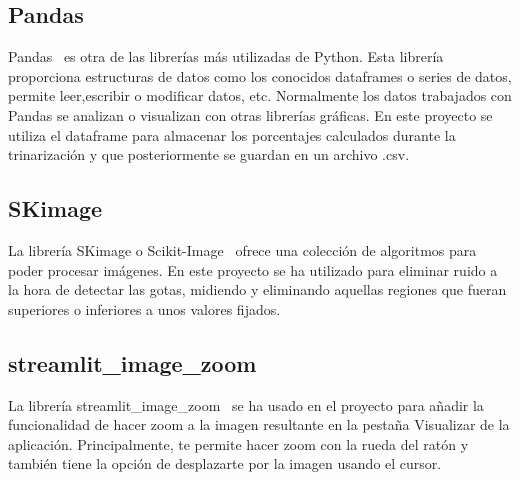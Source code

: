 \subsection{Pandas}
Pandas~\cite{pandas} es otra de las librerías más utilizadas de Python. Esta librería proporciona estructuras de datos como los conocidos dataframes o series de datos, permite leer,escribir o modificar datos, etc. Normalmente los datos trabajados con Pandas se analizan o visualizan con otras librerías gráficas. En este proyecto se utiliza el dataframe para almacenar los porcentajes calculados durante la trinarización y que posteriormente se guardan en un archivo .csv.

\subsection{SKimage}
La librería SKimage o Scikit-Image~\cite{skimage} ofrece una colección de algoritmos para poder procesar imágenes. En este proyecto se ha utilizado para eliminar ruido a la hora de detectar las gotas, midiendo y eliminando aquellas regiones que fueran superiores o inferiores a unos valores fijados.

\subsection{streamlit\_image\_zoom}
La librería streamlit\_image\_zoom~\cite{stimagezoom} se ha usado en el proyecto para añadir la funcionalidad de hacer zoom a la imagen resultante en la pestaña Visualizar de la aplicación. Principalmente, te permite hacer zoom con la rueda del ratón y también tiene la opción de desplazarte por la imagen usando el cursor.

